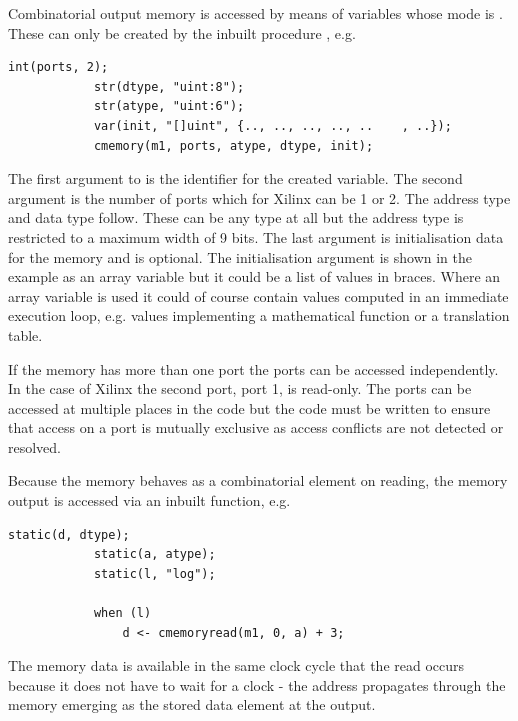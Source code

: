         Combinatorial output memory is accessed by means of variables whose mode
        is . These can only be created by the inbuilt procedure
        , e.g.
        \begin{lstlisting}[language=threepl]
            int(ports, 2);
            str(dtype, "uint:8");
            str(atype, "uint:6");
            var(init, "[]uint", {.., .., .., .., ..    , ..});
            cmemory(m1, ports, atype, dtype, init);
        \end{lstlisting}
        The first argument to  is the identifier for the created
        variable. The second argument is the number of ports which for Xilinx
        can be 1 or 2. The address type and data type follow. These can be any type
        at all but the address type is restricted to a maximum width of 9 bits.
        The last argument is initialisation data for the memory and is optional.
        The initialisation argument is shown in the example as an array variable
        but it could be a list of values in braces. Where an array variable is
        used it could of course contain values computed in an immediate execution
        loop, e.g. values implementing a mathematical function or a translation table.

        If the memory has more than one port the ports can be accessed independently.
        In the case of Xilinx the second port, port 1, is read-only. The ports can
        be accessed at multiple places in the code but the code must be written
        to ensure that access on a port is mutually exclusive as access conflicts are
        not detected or resolved.

        Because the memory behaves as a combinatorial element on reading, the memory
        output is accessed via an inbuilt function, e.g.
        \begin{lstlisting}[language=threepl]
            static(d, dtype);
            static(a, atype);
            static(l, "log");

            when (l)
                d <- cmemoryread(m1, 0, a) + 3;
        \end{lstlisting}
        The memory data is available in the same clock cycle that the read occurs
        because it does not have to wait for a clock - the address propagates through
        the memory emerging as the stored data element at the output.

